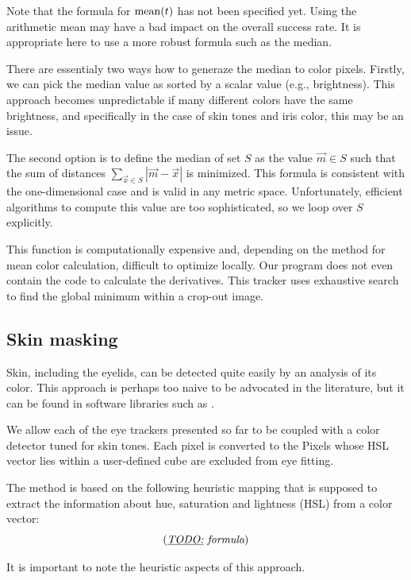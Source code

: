 Note that the formula for $\mathrm{mean}(t)$ has not been specified yet.
Using the arithmetic mean may have a bad impact on the overall success rate.
It is appropriate here to use a more robust formula such as the median.

There are essentialy two ways how to generaze the median to color pixels.
Firstly, we can pick the median value as sorted by a scalar value (e.g., brightness).
This approach becomes unpredictable if many different colors have the same brightness, and specifically in the case of skin tones and iris color, this may be an issue.

The second option is to define the median of set $S$ as the value $\vec m \in S$ such that the sum of distances $\sum_{\vec x \in S} |\vec m - \vec x|$ is minimized.
This formula is consistent with the one-dimensional case and is valid in any metric space.
Unfortunately, efficient algorithms to compute this value are too sophisticated, so we loop over $S$ explicitly.

This function is computationally expensive and, depending on the method for mean color calculation, difficult to optimize locally.
Our program does not even contain the code to calculate the derivatives.
This tracker uses exhaustive search to find the global minimum within a crop-out image.

\subsection{Skin masking}

Skin, including the eyelids, can be detected quite easily by an analysis of its color.
This approach is perhaps too naive to be advocated in the literature, but it can be found in software libraries such as \cite{deepgaze}.

We allow each of the eye trackers presented so far to be coupled with a color detector tuned for skin tones.
Each pixel is converted to the \todo{\dots}Pixels whose HSL vector lies within a user-defined cube are excluded from eye fitting.

The method is based on the following heuristic mapping that is supposed to extract the information about hue, saturation and lightness (HSL) from a color vector:
\begin{equation}
(\textit{\underline{TODO:} formula})
\end{equation}

It is important to note the heuristic aspects of this approach.

